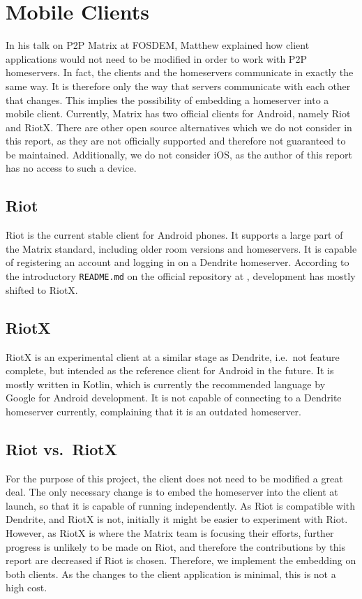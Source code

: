 \section{Mobile Clients}
In his talk on \ac{P2P} Matrix at FOSDEM\cite{fosdem_event_p2p_matrix}, Matthew explained how client applications would not need to be modified in order to work with \ac{P2P} homeservers.
In fact, the clients and the homeservers communicate in exactly the same way.
It is therefore only the way that servers communicate with each other that changes.
This implies the possibility of embedding a homeserver into a mobile client.
Currently, Matrix has two official clients for Android, namely Riot and RiotX.
There are other open source alternatives which we do not consider in this report, as they are not officially supported and therefore not guaranteed to be maintained.
Additionally, we do not consider iOS, as the author of this report has no access to such a device.

\subsection{Riot}
Riot is the current stable client for Android phones.
It supports a large part of the Matrix standard, including older room versions and homeservers.
It is capable of registering an account and logging in on a Dendrite homeserver.
According to the introductory \texttt{README.md} on the official repository at , development has mostly shifted to RiotX.

\subsection{RiotX}
RiotX is an experimental client at a similar stage as Dendrite, i.e.~not feature complete, but intended as the reference client for Android in the future.
It is mostly written in Kotlin, which is currently the recommended language by Google for Android development.
It is not capable of connecting to a Dendrite homeserver currently, complaining that it is an outdated homeserver.

\subsection{Riot vs.~RiotX}
For the purpose of this project, the client does not need to be modified a great deal.
The only necessary change is to embed the homeserver into the client at launch, so that it is capable of running independently.
As Riot is compatible with Dendrite, and RiotX is not, initially it might be easier to experiment with Riot.
However, as RiotX is where the Matrix team is focusing their efforts, further progress is unlikely to be made on Riot, and therefore the contributions by this report are decreased if Riot is chosen.
Therefore, we implement the embedding on both clients.
As the changes to the client application is minimal, this is not a high cost.

